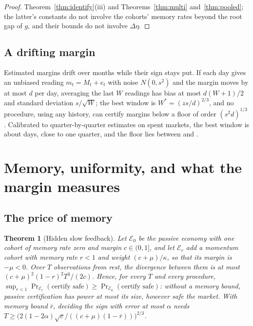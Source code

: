 \documentclass[12pt]{article}
\newtheorem{theorem}{Theorem}
\theoremstyle{definition}
\theoremstyle{remark}
\begin{document}
\begin{proof}
Theorem~\ref{thm:identify}(iii) and Theorems~\ref{thm:multi} and~\ref{thm:pooled}; the latter's constants do not involve the cohorts' memory rates beyond the root gap of $g$, and their bounds do not involve $\Delta\eta$.
\end{proof}

\subsection{A drifting margin}

Estimated margins drift over months while their sign stays put. If each day gives an unbiased reading $m_t=M_t+e_t$ with noise $N(0,s^2)$ and the margin moves by at most $d$ per day, averaging the last $W$ readings has bias at most $d(W+1)/2$ and standard deviation $s/\sqrt W$; the best window is $W^*=(zs/d)^{2/3}$, and no procedure, using any history, can certify margins below a floor of order $(s^2d)^{1/3}$ \citep[Proposition~4.7.4]{niroula2026thesis}. Calibrated to quarter-by-quarter estimates on \PsixSymbols{} spent markets, the best window is about \DriftW{} days, close to one quarter, and the floor lies between \DriftFloorLow{} and \DriftFloor{}.

\section{Memory, uniformity, and what the margin measures}\label{sec:memory}

\subsection{The price of memory}

\begin{theorem}[Hidden slow feedback]\label{thm:hidden}
Let $\mathcal E_0$ be the passive economy with one cohort of memory rate zero and margin $c\in(0,1]$, and let $\mathcal E_r$ add a momentum cohort with memory rate $r<1$ and weight $(c+\mu)/\kappa$, so that its margin is $-\mu<0$. Over $T$ observations from rest, the divergence between them is at most $(c+\mu)^2(1-r)^2T^3/(2c)$. Hence, for every $T$ and every procedure, $\sup_{r<1}\Pr_{\mathcal E_r}(\text{certify safe})\ge\Pr_{\mathcal E_0}(\text{certify safe})$: without a memory bound, passive certification has power at most its size, however safe the market. With memory bound $\bar r$, deciding the sign with error at most $\alpha$ needs $T\ge\big(2(1-2\alpha)\sqrt c/((c+\mu)(1-\bar r))\big)^{2/3}$.
\end{theorem}
\end{document}
